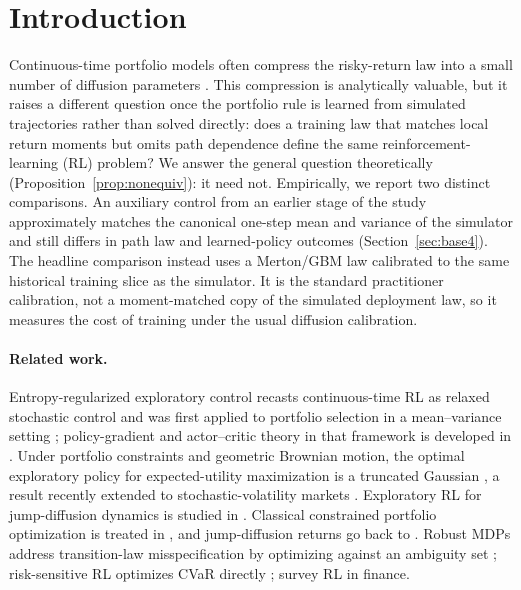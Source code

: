 \documentclass[11pt]{article}
\begin{document}
\section{Introduction}
Continuous-time portfolio models often compress the risky-return law into a small number of diffusion parameters \cite{Merton1969,Merton1971}. This compression is analytically valuable, but it raises a different question once the portfolio rule is learned from simulated trajectories rather than solved directly: does a training law that matches local return moments but omits path dependence define the same reinforcement-learning (RL) problem? We answer the general question theoretically (Proposition~\ref{prop:nonequiv}): it need not. Empirically, we report two distinct comparisons. An auxiliary control from an earlier stage of the study approximately matches the canonical one-step mean and variance of the simulator and still differs in path law and learned-policy outcomes (Section~\ref{sec:base4}). The headline comparison instead uses a Merton/GBM law calibrated to the same historical training slice as the simulator. It is the standard practitioner calibration, not a moment-matched copy of the simulated deployment law, so it measures the cost of training under the usual diffusion calibration.

\paragraph{Related work.} Entropy-regularized exploratory control recasts continuous-time RL as relaxed stochastic control \cite{WangZariphopoulouZhou2020} and was first applied to portfolio selection in a mean--variance setting \cite{WangZhou2020}; policy-gradient and actor--critic theory in that framework is developed in \cite{JiaZhou2022}. Under portfolio constraints and geometric Brownian motion, the optimal exploratory policy for expected-utility maximization is a truncated Gaussian \cite{ChauNguyenNguyen2026}, a result recently extended to stochastic-volatility markets \cite{NguyenNkuize2026}. Exploratory RL for jump-diffusion dynamics is studied in \cite{GaoLiZhou2024}. Classical constrained portfolio optimization is treated in \cite{CvitanicKaratzas1992}, and jump-diffusion returns go back to \cite{Merton1976}. Robust MDPs address transition-law misspecification by optimizing against an ambiguity set \cite{NilimElGhaoui2005,Iyengar2005}; risk-sensitive RL optimizes CVaR directly \cite{TamarGlassnerMannor2015}; \cite{HamblyXuYang2023} survey RL in finance.
\end{document}

